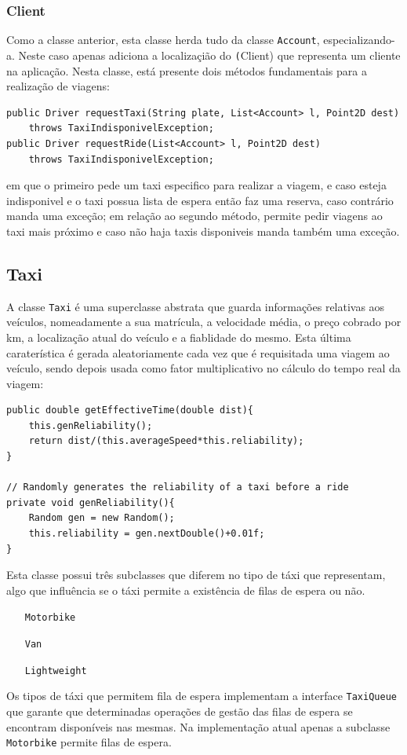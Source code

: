 \documentclass[a4paper,10pt,portuguese]{article}
\begin{document}
\subsubsection{Client}
Como a classe anterior, esta classe herda tudo da classe \texttt{Account}, especializando-a. Neste caso apenas adiciona a localizaçião do \texttt(Client) que representa um cliente na aplicação. Nesta classe, está presente dois métodos fundamentais para a realização de viagens:
\begin{verbatim}
public Driver requestTaxi(String plate, List<Account> l, Point2D dest) 
    throws TaxiIndisponivelException;
public Driver requestRide(List<Account> l, Point2D dest) 
    throws TaxiIndisponivelException;
\end{verbatim}
em que o primeiro pede um taxi especifico para realizar a viagem, e caso esteja indisponivel e o taxi possua lista de espera então faz uma reserva, caso contrário manda uma exceção; em relação ao segundo método, permite pedir viagens ao taxi mais próximo e caso não haja taxis disponiveis manda também uma exceção. 

\subsection{Taxi}
\label{Taxi}
A classe \texttt{Taxi} é uma superclasse abstrata que guarda informações relativas aos veículos, nomeadamente a sua matrícula, a velocidade média, o preço cobrado por km, a localização atual do veículo e a fiablidade do mesmo. Esta última caraterística é gerada aleatoriamente cada vez que é requisitada uma viagem ao veículo, sendo depois usada como fator multiplicativo no cálculo do tempo real da viagem:
\begin{verbatim}
public double getEffectiveTime(double dist){
    this.genReliability();
    return dist/(this.averageSpeed*this.reliability);
}
    
// Randomly generates the reliability of a taxi before a ride
private void genReliability(){
    Random gen = new Random();
    this.reliability = gen.nextDouble()+0.01f;
}
\end{verbatim}
Esta classe possui três subclasses que diferem no tipo de táxi que representam, algo que influência se o táxi permite a existência de filas de espera ou não.
\begin{itemize}
	\item[\texttt{Motorbike\label{Motorbike}}]
	\item[\texttt{Van}]
	\item[\texttt{Lightweight}]
\end{itemize}
Os tipos de táxi que permitem fila de espera implementam a interface \texttt{TaxiQueue} que garante que determinadas operações de gestão das filas de espera se encontram disponíveis nas mesmas. Na implementação atual apenas a subclasse \texttt{Motorbike} permite filas de espera.
\end{document}
